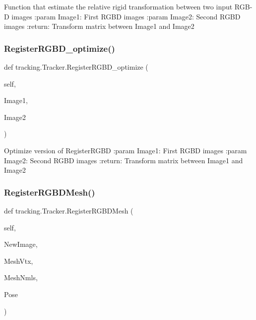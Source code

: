 \begin{DoxyVerb}Function that estimate the relative rigid transformation between two input RGB-D images
:param Image1: First RGBD images
:param Image2:  Second RGBD images
:return: Transform matrix between Image1 and Image2
\end{DoxyVerb}
 \mbox{\label{classtracking_1_1_tracker_a67305bad91e92f81957982b6b92556cc}} 
\subsubsection{Register\+R\+G\+B\+D\+\_\+optimize()}
{\footnotesize\ttfamily def tracking.\+Tracker.\+Register\+R\+G\+B\+D\+\_\+optimize (\begin{DoxyParamCaption}\item[{}]{self,  }\item[{}]{Image1,  }\item[{}]{Image2 }\end{DoxyParamCaption})}

\begin{DoxyVerb}Optimize version of  RegisterRGBD
:param Image1: First RGBD images
:param Image2:  Second RGBD images
:return: Transform matrix between Image1 and Image2
\end{DoxyVerb}
 \mbox{\label{classtracking_1_1_tracker_a99da5721b34cdb54cf89534ab2a77f35}} 
\subsubsection{Register\+R\+G\+B\+D\+Mesh()}
{\footnotesize\ttfamily def tracking.\+Tracker.\+Register\+R\+G\+B\+D\+Mesh (\begin{DoxyParamCaption}\item[{}]{self,  }\item[{}]{New\+Image,  }\item[{}]{Mesh\+Vtx,  }\item[{}]{Mesh\+Nmls,  }\item[{}]{Pose }\end{DoxyParamCaption})}

